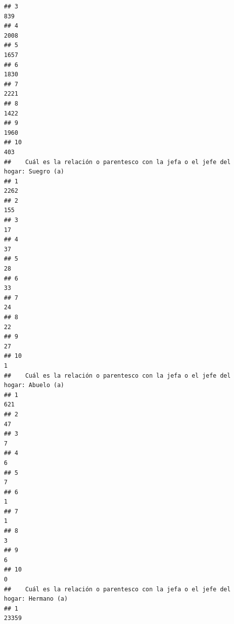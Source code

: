 \documentclass[11pt,]{article}
\begin{document}
\begin{verbatim}
## 3                                                                          839
## 4                                                                         2008
## 5                                                                         1657
## 6                                                                         1830
## 7                                                                         2221
## 8                                                                         1422
## 9                                                                         1960
## 10                                                                         403
##    Cuál es la relación o parentesco con la jefa o el jefe del hogar: Suegro (a)
## 1                                                                          2262
## 2                                                                           155
## 3                                                                            17
## 4                                                                            37
## 5                                                                            28
## 6                                                                            33
## 7                                                                            24
## 8                                                                            22
## 9                                                                            27
## 10                                                                            1
##    Cuál es la relación o parentesco con la jefa o el jefe del hogar: Abuelo (a)
## 1                                                                           621
## 2                                                                            47
## 3                                                                             7
## 4                                                                             6
## 5                                                                             7
## 6                                                                             1
## 7                                                                             1
## 8                                                                             3
## 9                                                                             6
## 10                                                                            0
##    Cuál es la relación o parentesco con la jefa o el jefe del hogar: Hermano (a)
## 1                                                                          23359

\end{verbatim}
\end{document}
